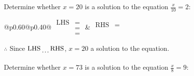 \documentclass[12pt]{article}
\newcounter{minipagecount}
\begin{document}
\begin{multicols}{2}
\begin{minipage}[t]{0.40\textwidth}
    \noindent Determine whether \(x = 20\) is a solution to the equation \(\frac{x}{10} = 2\):
    \vspace{2pt}  %

    \noindent
    \renewcommand{\arraystretch}{1.3} %
    \begin{tabular}{@{}p{0.60\linewidth}@{}p{0.40\linewidth}@{}}
        \(\begin{aligned}
            \text{LHS} &=  \\
                    &=  \\
                    &= 
        \end{aligned}\) &
        \(\begin{aligned}
            \text{RHS} &= \\
                    & \\
                    &
        \end{aligned}\)
    \end{tabular}
    \renewcommand{\arraystretch}{1.0} %
    \vspace{2pt}  %

    \noindent \(\therefore\) Since \(\text{LHS} \dotuline{\hspace{5mm}} \text{RHS}\), \(x = 20\) \dotuline{\hspace{12mm}} a solution to the equation.

\end{minipage}

\vspace*{0.5ex}
\vfill{}
\noindent{(\theminipagecount)}\hspace{0.1mm} %
\begin{minipage}[t]{0.40\textwidth} %

    \noindent Determine whether \(x = 73\) is a solution to the equation \(\frac{x}{8} = 9\):
    \vspace{2pt}  %


\end{minipage}
\end{multicols}
\end{document}
